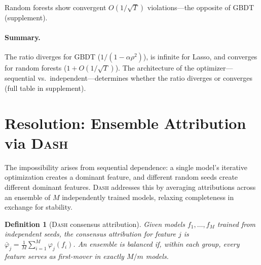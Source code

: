 \documentclass{article}
\newtheorem{definition}[theorem]{Definition}
\newcommand{\DASH}{\textsc{Dash}}
\newcommand{\GBDT}{\textsc{GBDT}}
\begin{document}
Random forests show convergent $O(1/\sqrt{T})$ violations---the opposite of \GBDT{} (supplement).

\paragraph{Summary.}
The ratio diverges for \GBDT{} ($1/(1{-}\alpha\rho^2)$), is infinite for Lasso, and converges for random forests ($1 + O(1/\sqrt{T})$).
The architecture of the optimizer---sequential vs.\ independent---determines whether the ratio diverges or converges (full table in supplement).

\section{Resolution: Ensemble Attribution via \DASH}
\label{sec:resolution}

The impossibility arises from sequential dependence: a single model's iterative optimization creates a dominant feature, and different random seeds create different dominant features.
\DASH{} addresses this by averaging attributions across an ensemble of $M$ independently trained models, relaxing completeness in exchange for stability.

\begin{definition}[\DASH{} consensus attribution]
\label{def:dash}
Given models $f_1, \ldots, f_M$ trained from independent seeds, the \emph{consensus attribution} for feature $j$ is
$\bar{\varphi}_j = \frac{1}{M} \sum_{i=1}^{M} \varphi_j(f_i)$.
An ensemble is \emph{balanced} if, within each group, every feature serves as first-mover in exactly $M/m$ models.
\end{definition}
\end{document}
